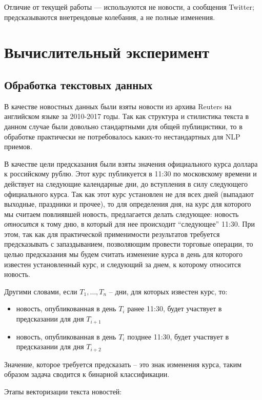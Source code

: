 \documentclass[pdftex,ptm,14pt,a4paper]{report}
\begin{document}
Отличие от текущей работы --- используются не новости, а сообщения Twitter; предсказываются внетрендовые колебания,
а не полные изменения.

\chapter{Вычислительный эксперимент}

\section{Обработка текстовых данных}

В качестве новостных данных были взяты новости из архива Reuters на английском языке за 2010-2017 годы.
Так как структура и стилистика текста в данном случае были довольно стандартными для общей публицистики,
то в обработке практически не потребовалось каких-то нестандартных для NLP приемов.

В качестве цели предсказания были взяты значения официального курса доллара к российскому рублю. Этот курс публикуется 
в 11:30 по московскому времени и действует на следующие календарные дни, до вступления в силу следующего
официального курса. Так как этот курс установлен не для всех дней (выпадают выходные, праздники и прочее),
то для определения дня, на курс для которого мы считаем повлиявшей новость, предлагается делать следующее:
новость \textit{относится} к тому дню, в который для нее происходит ``следующее'' 11:30. При этом, так как для практической
применимости результатов требуется предсказывать с запаздыванием, позволяющим провести торговые операции,
то целью предсказания мы будем считать изменение курса в день для которого известен установленный курс, и
следующий за днем, к которому относится новость.

Другими словами, если $T_1,\ldots , T_n$ -- дни, для которых известен курс, то:
\begin{itemize}
\item новость, опубликованная в день $T_i$ ранее 11:30, будет участвует в предсказании для дня $T_{i+1}$
\item новость, опубликованная в день $T_i$ позднее 11:30, будет участвует в предсказании для дня $T_{i+2}$
\end{itemize}

Значение, которое требуется предсказать -- это знак изменения курса, таким образом задача сводится к бинарной классификации.

Этапы векторизации текста новостей:
\end{document}

